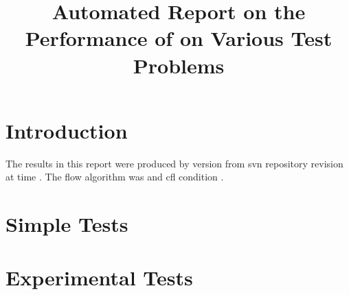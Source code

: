 \documentclass[11pt,a4paper]{report}
\begin{document}
 

\title{Automated Report on the Performance of \anuga on Various Test Problems}
\maketitle
\tableofcontents

\chapter{Introduction}

The results in this report were produced by \anuga{} version \majorR{} 
from svn repository revision \minorR{} at time \timeR.
The flow algorithm was \alg{} and cfl condition \cfl.

\chapter{Simple Tests}








\chapter{Experimental Tests}





\appendix
\end{document}
